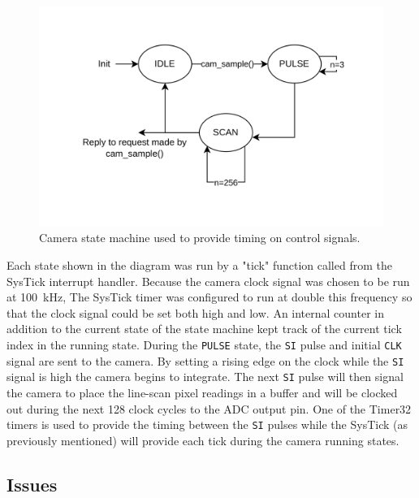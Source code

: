 \documentclass[CMPE]{../KGCOEReport}
\def\code#1{\texttt{#1}}
\begin{document}
	\begin{figure}[h!]
        \centering
        \includegraphics[width=12cm]{cam_state}
        \caption{Camera state machine used to provide timing on control signals.}
        \label{fig:cam_state}
	\end{figure}

	Each state shown in the diagram was run by a "tick" function called from the
	SysTick interrupt handler. Because the camera clock signal was chosen to be run
	at \SI{100}{\kilo\Hz}, The SysTick timer was configured to run at double this
	frequency so that the clock signal could be set both high and low. An internal
	counter in addition to the current state of the state machine kept track of
	the current tick index in the running state. During the \code{PULSE} state,
	the \code{SI} pulse and initial \code{CLK} signal are sent to the camera. By
	setting a rising edge on the clock while the \code{SI} signal is high the camera
	begins to integrate. The next \code{SI} pulse will then signal the camera to place
	the line-scan pixel readings in a buffer and will be clocked out during the next
	128 clock cycles to the ADC output pin. One of the Timer32 timers is used to provide
	the timing between the \code{SI} pulses while the SysTick (as previously mentioned)
	will provide each tick during the camera running states.

	\subsection*{Issues}
\end{document}
